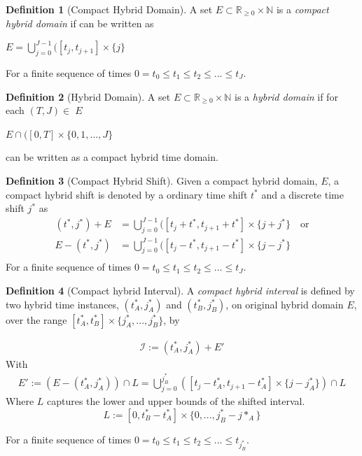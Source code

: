 \documentclass{article}
\theoremstyle{definition}
\newtheorem{definition}{Definition}[section]
\begin{document}
\begin{definition}[Compact Hybrid Domain] A set $E \subset \mathbb{R}_{\geq0} \times \mathbb{N}$ is a  \textit{compact hybrid domain} if can be written as
\begin{center}
    $E = \bigcup\limits_{j=0}^{J-1} ([t_j,t_{j+1}] \times \{j\}$
\end{center}
For a finite sequence of times $0 = t_0 \leq t_1 \leq t_2 \leq ... \leq t_J$.
\end{definition}

\begin{definition}[Hybrid Domain]
A set $E \subset \mathbb{R}_{\geq0} \times \mathbb{N}$ is a \textit{hybrid  domain} if for each $(T,J)\in\;E$
\begin{center}
    $E \cap ([0,T] \times \{0,1,...,J\}$
\end{center} 
can be written as a compact hybrid time domain.
\end{definition}

\begin{definition}[Compact Hybrid Shift] Given a compact hybrid domain, $E$, a {compact hybrid shift} is denoted by a ordinary time shift $t^*$ and a discrete time shift $j^*$ as
\begin{align}
    (t^*,j^*) + E &= \bigcup\limits_{j=0}^{J-1} ([t_j + t^*,t_{j+1}+t^*] \times \{j+j^*\}\quad \mathrm{or}\\
    E - (t^*,j^*) &= \bigcup\limits_{j=0}^{J-1} ([t_j - t^*,t_{j+1}-t^*] \times \{j-j^*\}\\
\end{align}
For a finite sequence of times $0 = t_0 \leq t_1 \leq t_2 \leq ... \leq t_J$.
\end{definition}

\begin{definition}[Compact hybrid Interval]
A \textit{compact hybrid interval} is defined by two hybrid time instances, $(t^*_A,j^*_A)$ and $(t^*_B,j^*_B)$, on original hybrid domain $E$, over the range $[t^*_A, t^*_B]\times\{j^*_A,..., j^*_B\}$, by

\begin{gather}
    \mathcal{I} := (t^*_A,j^*_A) + E'
\end{gather}
With
\begin{gather}
        E' := (E - (t^*_A,j^*_A)) \cap L = \bigcup\limits_{j=0}^{j^*_B} ([t_j - t^*_A, t_{j+1} - t^*_A] \times \{j-j^*_A\}) \cap L
\end{gather}
Where $L$ captures the lower and upper bounds of the shifted interval. 
\begin{equation}
        L  := [0,t^*_B - t^*_A]\times \{0,...,j^*_B-j*_A\}
\end{equation}

For a finite sequence of times $0 = t_0 \leq t_1 \leq t_2 \leq ... \leq t_{j^*_B}$. 
\end{definition}
\end{document}
